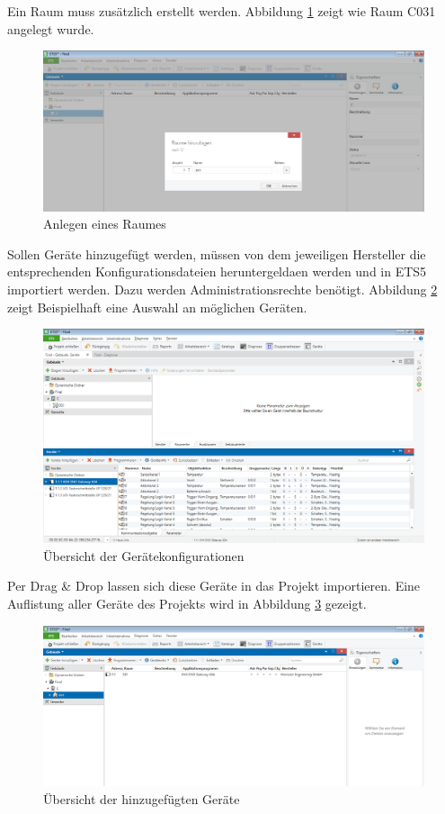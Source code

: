 \documentclass[a4paper]{article}
\begin{document}
Ein Raum muss zusätzlich erstellt werden. Abbildung \ref{fig:3} zeigt wie Raum C031 angelegt wurde.

\begin{figure}[h!]
\centering
\includegraphics[width=13cm]{Doku/3}
\caption{Anlegen eines Raumes}
\label{fig:3}
\end{figure}

Sollen Geräte hinzugefügt werden, müssen von dem jeweiligen Hersteller die entsprechenden Konfigurationsdateien heruntergeldaen werden und in ETS5 importiert werden. Dazu werden Administrationsrechte benötigt. Abbildung \ref{fig:4} zeigt Beispielhaft eine Auswahl an möglichen Geräten.

\begin{figure}[h!]
	\centering
	\includegraphics[width=13cm]{Doku/4}
	\caption{Übersicht der Gerätekonfigurationen}
	\label{fig:4}
\end{figure}

Per Drag \& Drop lassen sich diese Geräte in das Projekt importieren. Eine Auflistung aller Geräte des Projekts wird in Abbildung \ref{fig:5} gezeigt.

\begin{figure}[h!]
	\centering
	\includegraphics[width=13cm]{Doku/5}
	\caption{Übersicht der hinzugefügten Geräte}
	\label{fig:5}
\end{figure}
\end{document}
